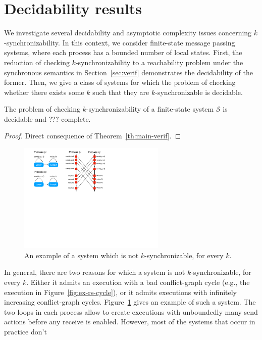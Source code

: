 \section{Decidability results}

We investigate several decidability and asymptotic complexity issues concerning $k$-synchronizability. In this context, we consider finite-state message passing systems, where each process has a bounded number of local states. First, the reduction of checking $k$-synchronizability to a reachability problem under the synchronous semantics in Section~\ref{sec:verif} demonstrates the decidability of the former. 
Then, we give a class of systems for which the problem of checking whether there exists some $k$ such that they are  $k$-synchronizable is decidable.

\begin{theorem}
The problem of checking $k$-synchronizability of a finite-state system $\mathcal{S}$ is decidable and ???-complete.
\end{theorem}
\begin{proof}
Direct consequence of Theorem~\ref{th:main-verif}.
\end{proof}

\begin{figure}
\includegraphics[width=7cm]{Ex-Decidability.pdf}
\caption{An example of a system which is not $k$-synchronizable, for every $k$.}
\label{fig:decid_ex}
\end{figure}

In general, there are two reasons for which a system is not $k$-synchronizable, for every $k$. Either it admits an execution with a bad conflict-graph cycle (e.g., the execution in Figure~\ref{fig:ex-rs-cycle}), or it admits executions with infinitely increasing conflict-graph cycles. Figure~\ref{fig:decid_ex} gives an example of such a system. 
The two loops in each process allow to create executions with unboundedly many send actions before any receive is enabled. However, most of the systems that occur in practice don't 